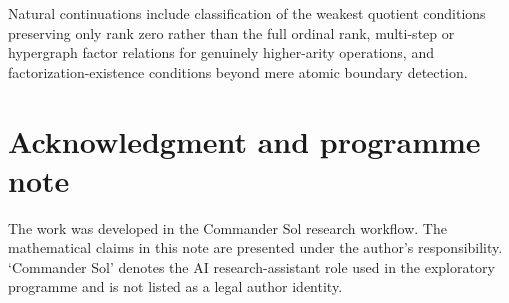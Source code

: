 \documentclass[11pt]{article}
\theoremstyle{definition}
\theoremstyle{remark}
\begin{document}
Natural continuations include classification of the weakest quotient conditions preserving only rank zero rather than the full ordinal rank, multi-step or hypergraph factor relations for genuinely higher-arity operations, and factorization-existence conditions beyond mere atomic boundary detection.

\section*{Acknowledgment and programme note}
The work was developed in the Commander Sol research workflow. The mathematical claims in this note are presented under the author's responsibility. `Commander Sol' denotes the AI research-assistant role used in the exploratory programme and is not listed as a legal author identity.



\end{document}
